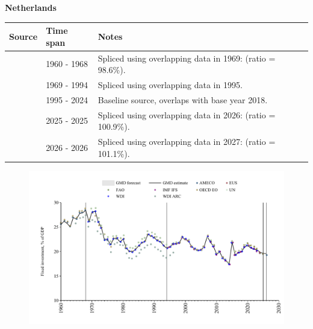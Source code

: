 \documentclass[12pt,a4paper,landscape]{article}
\begin{document}
\begin{adjustbox}{max totalsize={\paperwidth}{\paperheight},center}
\begin{minipage}[t][\textheight][t]{\textwidth}
\vspace*{0.5cm}
{}
\begin{center}
{\Large\bfseries Netherlands}
\end{center}
\vspace{0.5cm}
\begin{table}[H]
\centering
\small
\begin{tabular}{|l|l|l|}
\hline
\textbf{Source} & \textbf{Time span} & \textbf{Notes} \\
\hline
\rowcolor{white}\cite{OECD_EO}& 1960 - 1968 &Spliced using overlapping data in 1969: (ratio = 98.6\%).\\
\rowcolor{lightgray}\cite{WDI}& 1969 - 1994 &Spliced using overlapping data in 1995.\\
\rowcolor{white}\cite{EUS}& 1995 - 2024 &Baseline source, overlaps with base year 2018.\\
\rowcolor{lightgray}\cite{OECD_EO}& 2025 - 2025 &Spliced using overlapping data in 2026: (ratio = 100.9\%).\\
\rowcolor{white}\cite{AMECO}& 2026 - 2026 &Spliced using overlapping data in 2027: (ratio = 101.1\%).\\
\hline
\end{tabular}
\end{table}
\begin{figure}[H]
\centering
\includegraphics[width=\textwidth,height=0.6\textheight,keepaspectratio]{graphs/NLD_finv_GDP.pdf}
\end{figure}
\end{minipage}
\end{adjustbox}
\end{document}
